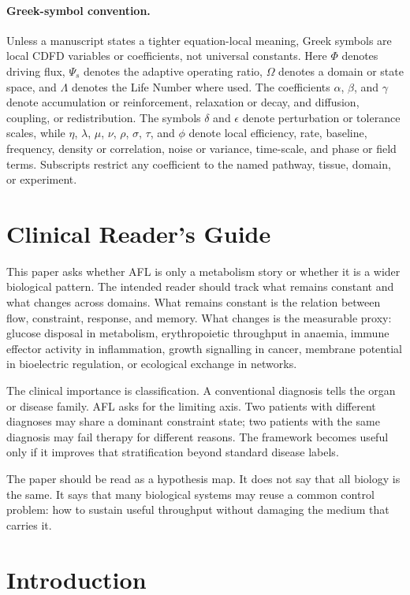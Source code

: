 \documentclass[11pt]{article}
\begin{document}
\paragraph{Greek-symbol convention.}
Unless a manuscript states a tighter equation-local meaning, Greek symbols are local CDFD variables or coefficients, not universal constants. Here $\Phi$ denotes driving flux, $\Psi_s$ denotes the adaptive operating ratio, $\Omega$ denotes a domain or state space, and $\Lambda$ denotes the Life Number where used. The coefficients $\alpha$, $\beta$, and $\gamma$ denote accumulation or reinforcement, relaxation or decay, and diffusion, coupling, or redistribution. The symbols $\delta$ and $\epsilon$ denote perturbation or tolerance scales, while $\eta$, $\lambda$, $\mu$, $\nu$, $\rho$, $\sigma$, $\tau$, and $\phi$ denote local efficiency, rate, baseline, frequency, density or correlation, noise or variance, time-scale, and phase or field terms. Subscripts restrict any coefficient to the named pathway, tissue, domain, or experiment.

\section*{Clinical Reader's Guide}
This paper asks whether AFL is only a metabolism story or whether it is a wider biological pattern. The intended reader should track what remains constant and what changes across domains. What remains constant is the relation between flow, constraint, response, and memory. What changes is the measurable proxy: glucose disposal in metabolism, erythropoietic throughput in anaemia, immune effector activity in inflammation, growth signalling in cancer, membrane potential in bioelectric regulation, or ecological exchange in networks.

The clinical importance is classification. A conventional diagnosis tells the organ or disease family. AFL asks for the limiting axis. Two patients with different diagnoses may share a dominant constraint state; two patients with the same diagnosis may fail therapy for different reasons. The framework becomes useful only if it improves that stratification beyond standard disease labels.

The paper should be read as a hypothesis map. It does not say that all biology is the same. It says that many biological systems may reuse a common control problem: how to sustain useful throughput without damaging the medium that carries it.


\section{Introduction}
\end{document}

